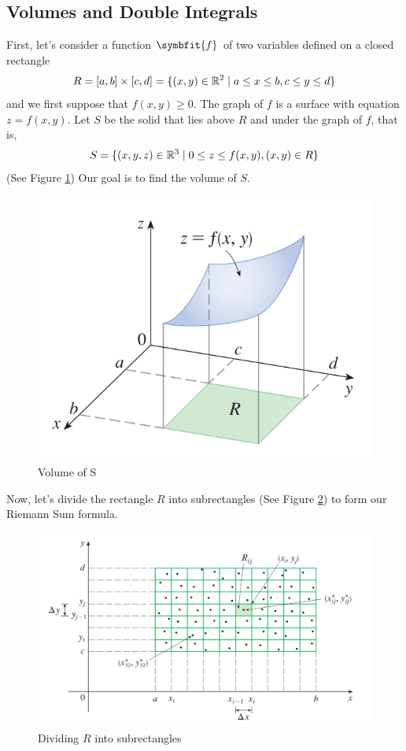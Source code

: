 \documentclass[math,code]{amznotes}
\theoremstyle{remark}
\begin{document}
\subsection{Volumes and Double Integrals}
First, let's consider a function $\symbfit{f}$ of two variables defined on a closed rectangle
\begin{displaymath}
    R = [a,b]\times[c,d]=\{(x,y)\in \mathbb{R}^2 \mid a \leq x \leq b, c \leq y \leq d \}
\end{displaymath}
and we first suppose that $f(x,y)\geq 0$. The graph of $f$ is a surface with equation $z=f(x,y)$. Let $S$ be the solid that lies above $R$ and under the graph of $f$, that is,
\begin{displaymath}
    S=\{(x,y,z)\in \mathbb{R}^3 \mid 0 \leq z \leq f(x,y), (x,y) \in R\}
\end{displaymath}
(See Figure \ref{fig:volume-and-double-integrals}) Our goal is to find the volume of $S$.
\begin{figure}[H]
    \centering
    \includegraphics[width=0.5\linewidth]{images/volumes-and-double-integrals.png}
    \caption{Volume of S}
    \label{fig:volume-and-double-integrals}
\end{figure}
Now, let's divide the rectangle $R$ into subrectangles (See Figure \ref{fig:dividing-r-into-subrectangles}) to form our Riemann Sum formula.
\begin{figure}[H]
    \centering
    \includegraphics[width=0.5\linewidth]{images/double-integral-riemann-sum-1.png}
    \caption{Dividing $R$ into subrectangles}
    \label{fig:dividing-r-into-subrectangles}
\end{figure}
\end{document}
